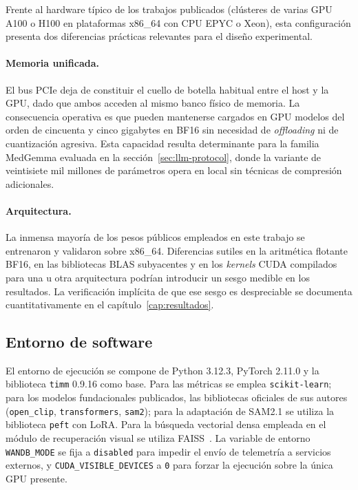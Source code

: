 Frente al hardware típico de los trabajos publicados (clústeres de
varias GPU A100 o H100 en plataformas x86\_64 con CPU EPYC o Xeon),
esta configuración presenta dos diferencias prácticas relevantes
para el diseño experimental.

\paragraph{Memoria unificada.} El bus PCIe deja de constituir el
cuello de botella habitual entre el host y la GPU, dado que ambos
acceden al mismo banco físico de memoria. La consecuencia operativa
es que pueden mantenerse cargados en GPU modelos del orden de
cincuenta y cinco gigabytes en BF16 sin necesidad de \emph{offloading}
ni de cuantización agresiva. Esta capacidad resulta determinante
para la familia MedGemma evaluada en la
sección~\ref{sec:llm-protocol}, donde la variante de veintisiete mil
millones de parámetros opera en local sin técnicas de compresión
adicionales.

\paragraph{Arquitectura.} La inmensa mayoría de los pesos públicos
empleados en este trabajo se entrenaron y validaron sobre
x86\_64. Diferencias sutiles en la aritmética flotante BF16, en las
bibliotecas BLAS subyacentes y en los \emph{kernels} CUDA
compilados para una u otra arquitectura podrían introducir un sesgo
medible en los resultados. La verificación implícita de que ese
sesgo es despreciable se documenta cuantitativamente en el
capítulo~\ref{cap:resultados}.

\subsection{Entorno de software}
\label{sec:hardware-software}

El entorno de ejecución se compone de Python 3.12.3, PyTorch
2.11.0 y la biblioteca \texttt{timm} 0.9.16 como base. Para las
métricas se emplea \texttt{scikit-learn}; para los modelos
fundacionales publicados, las bibliotecas oficiales de sus autores
(\texttt{open\_clip}, \texttt{transformers}, \texttt{sam2}); para la
adaptación de SAM2.1 se utiliza la biblioteca \texttt{peft} con
LoRA. Para la búsqueda vectorial densa empleada en el módulo de
recuperación visual se utiliza FAISS~\cite{faiss2019}. La variable
de entorno \texttt{WANDB\_MODE} se fija a \texttt{disabled} para
impedir el envío de telemetría a servicios externos, y
\texttt{CUDA\_VISIBLE\_DEVICES} a \texttt{0} para forzar la
ejecución sobre la única GPU presente.

